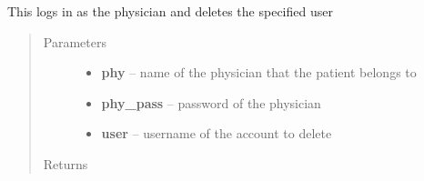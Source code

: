 \documentclass[letterpaper,10pt,english]{sphinxmanual}
\begin{document}
\begin{fulllineitems}

\begin{fulllineitems}
\label{STD/WebUI:WebUI.WebUI.WebUI.delete_experiment}
\end{fulllineitems}


\begin{fulllineitems}
\label{STD/WebUI:WebUI.WebUI.WebUI.delete_patient}
This logs in as the physician and deletes the specified user
\begin{quote}\begin{description}
\item[{Parameters}] \leavevmode\begin{itemize}
\item {} 
\textbf{phy} -- name of the physician that the patient belongs to

\item {} 
\textbf{phy\_pass} -- password of the physician

\item {} 
\textbf{user} -- username of the account to delete

\end{itemize}

\item[{Returns}] \leavevmode


\end{description}\end{quote}

\end{fulllineitems}


\begin{fulllineitems}
\label{STD/WebUI:WebUI.WebUI.WebUI.driver}
\end{fulllineitems}


\begin{fulllineitems}
\label{STD/WebUI:WebUI.WebUI.WebUI.export_data}
\end{fulllineitems}


\end{fulllineitems}
\end{document}
